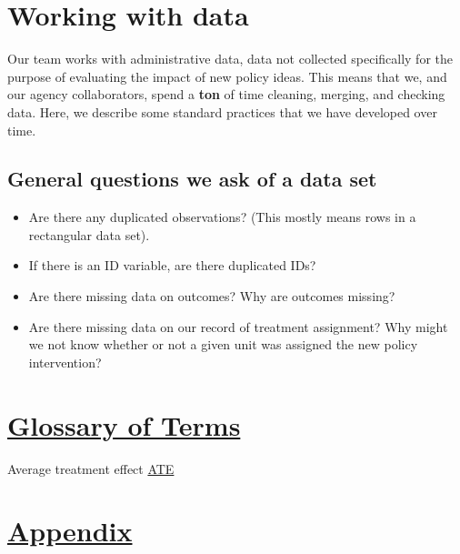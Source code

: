 \documentclass[
  12pt,
]{book}
\providecommand{\tightlist}{%
  \setlength{\itemsep}{0pt}\setlength{\parskip}{0pt}}
\theoremstyle{definition}
\theoremstyle{definition}
\theoremstyle{definition}
\theoremstyle{remark}
\begin{document}
\hypertarget{working-with-data}{%
\chapter{Working with data}\label{working-with-data}}

Our team works with administrative data, data not collected specifically
for the purpose of evaluating the impact of new policy ideas. This means
that we, and our agency collaborators, spend a \textbf{ton} of time
cleaning, merging, and checking data. Here, we describe some standard
practices that we have developed over time.

\hypertarget{general-questions-we-ask-of-a-data-set}{%
\section{General questions we ask of a data
set}\label{general-questions-we-ask-of-a-data-set}}

\begin{itemize}
\tightlist
\item
  Are there any duplicated observations? (This mostly means rows in a
  rectangular data set).
\item
  If there is an ID variable, are there duplicated IDs?
\item
  Are there missing data on outcomes? Why are outcomes missing?
\item
  Are there missing data on our record of treatment assignment? Why
  might we not know whether or not a given unit was assigned the new
  policy intervention?
\end{itemize}

\hypertarget{glossary-of-terms}{%
\chapter{\texorpdfstring{\protect\hyperlink{glossary}{Glossary of
Terms}}{Glossary of Terms}}\label{glossary-of-terms}}

Average treatment effect \protect\hyperlink{ATE}{ATE}

\hypertarget{appendix}{%
\chapter{\texorpdfstring{\protect\hyperlink{appendix}{Appendix}}{Appendix}}\label{appendix}}

\backmatter
  
\end{document}
